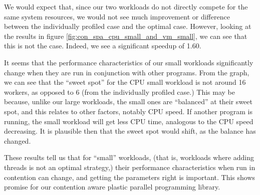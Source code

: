We would expect that, since our two workloads do not directly compete for the same system resources, we would not see much improvement or difference between the individually profiled case and the optimal case. However, looking at the results in figure \ref{fig:con_spa_cpu_small_and_vm_small}, we can see that this is not the case. Indeed, we see a significant speedup of 1.60. 

It seems that the performance characteristics of our small workloads significantly change when they are run in conjunction with other programs. From the graph, we can see that the ``sweet spot'' for the CPU small workload is not around 16 workers, as opposed to 6 (from the individually profiled case.) This may be because, unlike our large workloads, the small ones are ``balanced'' at their sweet spot, and this relates to other factors, notably CPU speed. If another program is running, the small workload will get less CPU time, analogous to the CPU speed decreasing. It is plausible then that the sweet spot would shift, as the balance has changed.

These results tell us that for ``small'' workloads, (that is, workloads where adding threads is not an optimal strategy,) their performance characteristics when run in contention can change, and getting the parameters right is important. This shows promise for our contention aware plastic parallel programming library.



